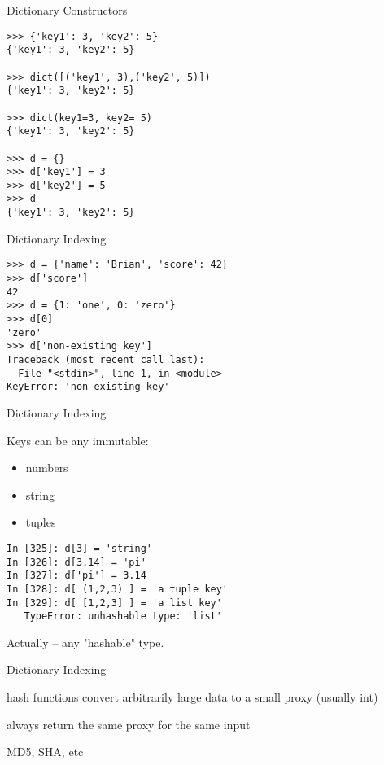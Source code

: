 \documentclass{beamer}
\begin{document}
\begin{frame}[fragile]{Dictionary Constructors}

\begin{verbatim}
>>> {'key1': 3, 'key2': 5}
{'key1': 3, 'key2': 5}

>>> dict([('key1', 3),('key2', 5)])
{'key1': 3, 'key2': 5}

>>> dict(key1=3, key2= 5)
{'key1': 3, 'key2': 5}

>>> d = {}
>>> d['key1'] = 3
>>> d['key2'] = 5
>>> d
{'key1': 3, 'key2': 5}
\end{verbatim}

\end{frame} 

\begin{frame}[fragile]{Dictionary Indexing}

\begin{verbatim}
>>> d = {'name': 'Brian', 'score': 42}
>>> d['score']
42
>>> d = {1: 'one', 0: 'zero'}
>>> d[0]
'zero'
>>> d['non-existing key']
Traceback (most recent call last):
  File "<stdin>", line 1, in <module>
KeyError: 'non-existing key'
\end{verbatim}

\end{frame} 

\begin{frame}[fragile]{Dictionary Indexing}

{\Large Keys can be any immutable:}
\begin{itemize}
  \item numbers
  \item string
  \item tuples
\end{itemize}

\begin{verbatim}
In [325]: d[3] = 'string'
In [326]: d[3.14] = 'pi'
In [327]: d['pi'] = 3.14
In [328]: d[ (1,2,3) ] = 'a tuple key'
In [329]: d[ [1,2,3] ] = 'a list key'
   TypeError: unhashable type: 'list'
\end{verbatim}

\vfill
Actually -- any "hashable" type.
\end{frame} 

\begin{frame}[fragile]{Dictionary Indexing}

\vfill
{\Large hash functions convert arbitrarily large data to a small proxy (usually int)

\vfill
always return the same proxy for the same input

\vfill
MD5, SHA, etc
\vfill
}
\end{frame} 
\end{document}
